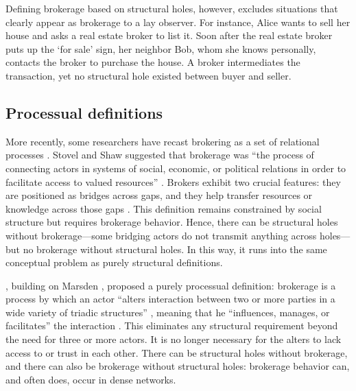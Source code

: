 \documentclass[
]{article}
\begin{document}
Defining brokerage based on structural holes, however, excludes situations that clearly appear as brokerage to a lay observer. For instance, Alice wants to sell her house and asks a real estate broker to list it. Soon after the real estate broker puts up the `for sale' sign, her neighbor Bob, whom she knows personally, contacts the broker to purchase the house. A broker intermediates the transaction, yet no structural hole existed between buyer and seller.

\subsection{Processual definitions}

More recently, some researchers have recast brokering as a set of relational processes \autocite{obstfeldBrokerageProcessDecoupling2014,rossmanObfuscatoryRelationalWork2014,spiroExtendedStructuresMediation2013,stovelBrokerage2012}. Stovel and Shaw suggested that brokerage was ``the process of connecting actors in systems of social, economic, or political relations in order to facilitate access to valued resources'' \autocite[141]{stovelBrokerage2012} \autocite[see also][]{stovelStabilizingBrokerage2011}. Brokers exhibit two crucial features: they are positioned as bridges across gaps, and they help transfer resources or knowledge across those gaps \autocite[141]{stovelBrokerage2012}. This definition remains constrained by social structure but requires brokerage behavior. Hence, there can be structural holes without brokerage---some bridging actors do not transmit anything across holes---but no brokerage without structural holes. In this way, it runs into the same conceptual problem as purely structural definitions.

\textcite{obstfeldBrokerageProcessDecoupling2014}, building on Marsden \autocite*{marsdenBrokerageBehaviorRestricted1982}, proposed a purely processual definition: brokerage is a process by which an actor ``alters interaction between two or more parties in a wide variety of triadic structures'' \autocite[136]{obstfeldBrokerageProcessDecoupling2014}, meaning that he ``influences, manages, or facilitates'' the interaction \autocite[141]{obstfeldBrokerageProcessDecoupling2014}. This eliminates any structural requirement beyond the need for three or more actors. It is no longer necessary for the alters to lack access to or trust in each other. There can be structural holes without brokerage, and there can also be brokerage without structural holes: brokerage behavior can, and often does, occur in dense networks.
\end{document}
